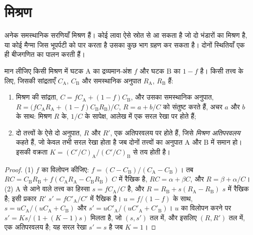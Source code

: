 \section{मिश्रण}

अनेक समस्थानिक सरणियाँ मिश्रण हैं। कोई लावा ऐसे स्रोत से आ सकता है जो
दो भंडारों का मिश्रण है, या कोई मैग्मा जिस भूपर्पटी को पार करता है उसका कुछ भाग ग्रहण कर सकता है।
दोनों स्थितियाँ एक ही बीजगणित का पालन करती हैं।

\begin{proposition}[मिश्रण अतिपरवलय]\label{prop:b2:isotope-geochemistry:mixing}
मान लीजिए किसी मिश्रण में घटक A का द्रव्यमान-अंश $f$ और घटक
B का $1-f$ है। किसी तत्त्व के लिए, जिसकी सांद्रताएँ $C_{\mathrm A}$, $C_{\mathrm B}$ और समस्थानिक
अनुपात $R_{\mathrm A}$, $R_{\mathrm B}$ हैं:
\begin{enumerate}
\item मिश्रण की सांद्रता, $C = fC_{\mathrm A} + (1-f)C_{\mathrm B}$, और
उसका समस्थानिक अनुपात,
$R = \bigl(fC_{\mathrm A}R_{\mathrm A} + (1-f)C_{\mathrm B}R_{\mathrm B}\bigr)/C$,
$R = a + b/C$ को संतुष्ट करते हैं, अचर $a$ और $b$ के साथ: मिश्रण
$R$ के, $1/C$ के सापेक्ष, आलेख में एक सरल रेखा पर होते हैं;
\item दो तत्त्वों के ऐसे दो अनुपात, $R$ और $R'$, एक अतिपरवलय पर होते हैं, जिसे
\emph{मिश्रण अतिपरवलय} कहते हैं, जो केवल तभी सरल रेखा होता है
जब दोनों तत्त्वों का अनुपात A और B में समान हो। इसकी वक्रता
$K = (C'/C)_{\mathrm A}/(C'/C)_{\mathrm B}$ से तय होती है।
\end{enumerate}
\end{proposition}

\begin{proof}
(1) $f$ का विलोपन कीजिए: $f = (C - C_{\mathrm B})/(C_{\mathrm A} - C_{\mathrm B})$। तब
$RC = C_{\mathrm B}R_{\mathrm B} + f(C_{\mathrm A}R_{\mathrm A} - C_{\mathrm B}R_{\mathrm
B})$ $C$ में रैखिक है, $RC = \alpha + \beta C$, और $R = \beta + \alpha/C$।
(2) A से आने वाले तत्त्व का हिस्सा $s = fC_{\mathrm A}/C$ है, और $R =
R_{\mathrm B} + s(R_{\mathrm A} - R_{\mathrm B})$ $s$ में रैखिक है; इसी प्रकार $R'$
$s' = fC'_{\mathrm A}/C'$ में रैखिक है। $u = f/(1-f)$ के साथ, $s = u C_{\mathrm
A}/(uC_{\mathrm A} + C_{\mathrm B})$ और $s' = uC'_{\mathrm A}/(uC'_{\mathrm A} +
C'_{\mathrm B})$। $u$ का विलोपन करने पर $s' = Ks/(1 + (K-1)s)$ मिलता है, जो
$(s, s')$ तल में, और इसलिए $(R, R')$ तल में, एक अतिपरवलय है; यह सरल रेखा $s' = s$ है
जब $K = 1$।
\end{proof}

